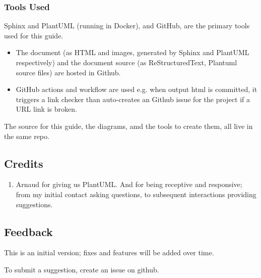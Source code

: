 \documentclass[letterpaper,10pt,english]{sphinxmanual}
\begin{document}
\subsubsection{Tools Used}
\label{\detokenize{about/AboutThisGuide:tools-used}}\label{\detokenize{about/AboutThisGuide:tools-label}}
Sphinx and PlantUML (running in Docker), and GitHub, are the primary tools used for this guide.
\begin{itemize}
\item {} 
The document (as HTML and images, generated by Sphinx and PlantUML respectively) and the document source (as ReStructuredText, Plantuml source files) are hosted in Github.

\item {} 
GitHub actions and workflow are used e.g. when output html is committed, it triggers a link checker than auto-creates an Github issue for the project if a URL link is broken.

\end{itemize}

The source for this guide, the diagrams, amd the tools to create them, all live in the same repo.


\subsection{Credits}
\label{\detokenize{about/AboutThisGuide:credits}}\begin{enumerate}
%
\item {} 
Arnaud for giving us PlantUML. And for being receptive and responsive; from my initial contact asking questions, to subsequent interactions providing suggestions.

\end{enumerate}


\subsection{Feedback}
\label{\detokenize{about/AboutThisGuide:feedback}}
This is an initial version; fixes and features will be added over time.

To submit a suggestion, create an issue on github.
\end{document}
